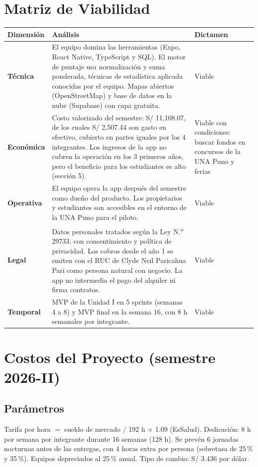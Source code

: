 \documentclass[11pt,a4paper]{article}
\begin{document}
\section{Matriz de Viabilidad}
{\small
\noindent\begin{tabularx}{\textwidth}{@{}P{2.3cm} L P{2.5cm}@{}}
\toprule
{}
\textbf{Dimensión} & \textbf{Análisis} & \textbf{Dictamen} \\
\midrule
\textbf{Técnica} & El equipo domina las herramientas (Expo, React Native, TypeScript y SQL). El motor de puntaje usa normalización y suma ponderada, técnicas de estadística aplicada conocidas por el equipo. Mapas abiertos (OpenStreetMap) y base de datos en la nube (Supabase) con capa gratuita. & Viable \\
\addlinespace[2pt]
\textbf{Económica} & Costo valorizado del semestre: S/ 11,108.07, de los cuales S/ 2,507.44 son gasto en efectivo, cubierto en partes iguales por los 4 integrantes. Los ingresos de la app no cubren la operación en los 3 primeros años, pero el beneficio para los estudiantes es alto (sección 5). & Viable con condiciones: buscar fondos en concursos de la UNA Puno y ferias \\
\addlinespace[2pt]
\textbf{Operativa} & El equipo opera la app después del semestre como dueño del producto. Los propietarios y estudiantes son accesibles en el entorno de la UNA Puno para el piloto. & Viable \\
\addlinespace[2pt]
\textbf{Legal} & Datos personales tratados según la Ley N.\textsuperscript{o} 29733, con consentimiento y política de privacidad. Los cobros desde el año 1 se emiten con el RUC de Clyde Neil Paricahua Pari como persona natural con negocio. La app no intermedia el pago del alquiler ni firma contratos. & Viable \\
\addlinespace[2pt]
\textbf{Temporal} & MVP de la Unidad I en 5 sprints (semanas 4 a 8) y MVP final en la semana 16, con 8 h semanales por integrante. & Viable \\
\bottomrule
\end{tabularx}
}

\section{Costos del Proyecto (semestre 2026-II)}

\subsection{Parámetros}
Tarifa por hora $=$ sueldo de mercado $/$ 192 h $\times$ 1.09 (EsSalud). Dedicación: 8 h por semana por integrante durante 16 semanas (128 h). Se prevén 6 jornadas nocturnas antes de las entregas, con 4 horas extra por persona (sobretasa de 25\,\% y 35\,\%). Equipos depreciados al 25\,\% anual. Tipo de cambio: S/ 3.436 por dólar.
\end{document}
